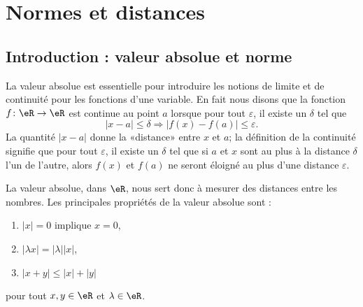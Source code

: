 
\section{Normes et distances}\label{Sect_definition}

\subsection{Introduction : valeur absolue et norme}

La valeur absolue est essentielle pour introduire les notions de limite et de continuité pour les fonctions d'une variable. En fait nous disons que la fonction $f\colon \eR\to \eR$ est continue au point $a$ lorsque pour tout $\varepsilon$, il existe un $\delta$ tel que
\begin{equation}
	| x-a |\leq\delta \Rightarrow | f(x)-f(a) |\leq \varepsilon.
\end{equation}
La quantité $| x-a |$ donne la «distance» entre $x$ et $a$; la définition de la continuité signifie que pour tout $\varepsilon$, il existe un $\delta$ tel que si $a$ et $x$ sont au plus à la distance $\delta$ l'un de l'autre, alors $f(x)$ et $f(a)$ ne seront éloigné au plus d'une distance $\varepsilon$.

La valeur absolue, dans $\eR$, nous sert donc à mesurer des distances entre les nombres. Les principales propriétés de la valeur absolue sont :
\begin{enumerate}

	\item
		$| x |=0$ implique $x=0$,
	\item
		$| \lambda x |=| \lambda | |x |$,
	\item
		$| x+y |\leq | x |+| y |$

\end{enumerate}
pour tout $x,y\in\eR$ et $\lambda\in\eR$.

